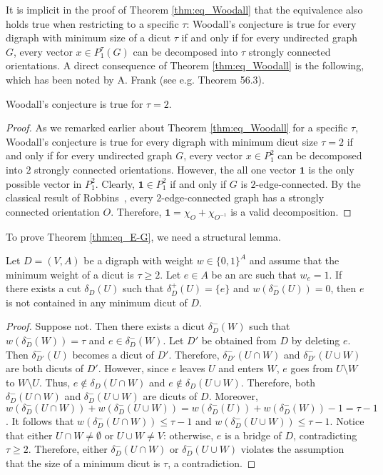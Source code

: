 \documentclass[runningheads]{llncs}
\begin{document}
It is implicit in the proof of Theorem \ref{thm:eq_Woodall} that the equivalence also holds true when restricting to a specific $\tau$:  Woodall's conjecture is true for every digraph with minimum size of a dicut $\tau$ if and only if for every undirected graph $G$, every vector $x\in P_1^\tau(G)$ can be decomposed into $\tau$ strongly connected orientations. A direct consequence of Theorem \ref{thm:eq_Woodall} is the following, which has been noted by A. Frank (see e.g. \cite{schrijver2003combinatorial} Theorem 56.3).
\begin{corollary}\label{cor:tau=2}
    Woodall's conjecture is true for $\tau=2$.
\end{corollary}
\begin{proof}
    As we remarked earlier about Theorem \ref{thm:eq_Woodall} for a specific $\tau$, Woodall's conjecture is true for every digraph with minimum dicut size $\tau=2$ if and only if for every undirected graph $G$, every vector $x\in P_1^2$ can be decomposed into $2$ strongly connected orientations. However, the all one vector $\mathbf{1}$ is the only possible vector in $P_1^2$. Clearly, $\mathbf{1}\in P_1^2$ if and only if $G$ is $2$-edge-connected. By the classical result of Robbins~\cite{robbins1939theorem}, every $2$-edge-connected graph has a strongly connected orientation $O$. Therefore, $\mathbf{1}=\chi_O+\chi_{O^{-1}}$ is a valid decomposition.  
\end{proof}



 To prove Theorem \ref{thm:eq_E-G}, we need a structural lemma.    
    \begin{lemma}\label{lemma:near_dicut}
        Let $D=(V,A)$ be a digraph with weight $w\in\{0,1\}^A$ and assume that the minimum weight of a dicut is $\tau\geq 2$. Let $e\in A$ be an arc such that $w_e=1$. If there exists a cut $\delta_D(U)$ such that $\delta_D^+(U)=\{e\}$ and $w(\delta_D^-(U))=0$, then $e$ is not contained in any minimum dicut of $D$.
    \end{lemma}
    \begin{proof}
        Suppose not. Then there exists a dicut $\delta_D^-(W)$ such that $w(\delta_D^-(W))=\tau$ and $e\in \delta_D^-(W)$. Let $D'$ be obtained from $D$ by deleting $e$. Then $\delta_{D'}^-(U)$ becomes a dicut of $D'$. Therefore, $\delta_{D'}^-(U\cap W)$ and $\delta_{D'}^-(U\cup W)$ are both dicuts of $D'$. However, since $e$ leaves $U$ and enters $W$, $e$ goes from $U\setminus W$ to $W\setminus U$. Thus, $e\notin \delta_D(U\cap W)$ and $e\notin \delta_D(U\cup W)$. Therefore, both $\delta_{D}^-(U\cap W)$ and $\delta_{D}^-(U\cup W)$ are dicuts of $D$. Moreover, $w(\delta_{D}^-(U\cap W))+w(\delta_{D}^-(U\cup W))=w(\delta_{D}^-(U))+w(\delta_{D}^-(W))-1=\tau-1$.
        It follows that $w(\delta_{D}^-(U\cap W))\leq \tau-1$ and $w(\delta_{D}^-(U\cup W))\leq \tau-1$. Notice that either $U\cap W\neq \emptyset$ or $U\cup W\neq V$: otherwise, $e$ is a bridge of $D$, contradicting $\tau\geq 2$. Therefore, either $\delta_{D}^-(U\cap W)$ or $\delta_{D}^-(U\cup W)$ violates the assumption that the size of a minimum dicut is $\tau$, a contradiction.
    \end{proof}
        
\end{document}
